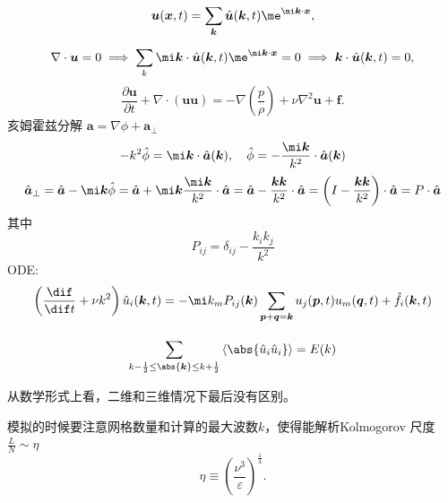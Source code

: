 \documentclass[12pt,a4]{ctexart}
\begin{document}
\begin{equation}
   \bm{u} (\bm{x} , t) = \sum_{\bm{k} }^{} \hat{\bm{u} } (\bm{k} ,t) \me^{\mi \bm{k} \cdot \bm{x} },
\end{equation}
\begin{equation}
   \nabla \cdot \bm{u} = 0 \implies \sum_{k}^{} \mi \bm{k} \cdot \hat{\bm{u} } (\bm{k} ,t) \me^{\mi \bm{k} \cdot \bm{x} } = 0 \implies \bm{k} \cdot \hat{\bm{u} }(\bm{k} ,t)=0,
\end{equation}
\begin{equation}
   \frac{\partial \bm{u} }{\partial t}  + \nabla \cdot (\bm{u} \bm{u} ) = - \nabla \left( \frac{p}{\rho} \right) + \nu \nabla ^2 \bm{u} + \bm{f}.
\end{equation}
亥姆霍兹分解 $\bm{a} = \nabla \phi + \bm{a}_{\bot}$
\begin{equation}
   -k^2 \hat{\phi} = \mi \bm{k}  \cdot \hat{\bm{a} }(\bm{k} ),\quad \hat{\phi} = - \frac{\mi \bm{k} }{k^2} \cdot \hat{\bm{a} }(\bm{k} )
\end{equation}
\begin{equation}
   \hat{\bm{a} }_{\bot} = \hat{\bm{a} } - \mi \bm{k} \hat{\phi} = \hat{\bm{a} } + \mi \bm{k} \frac{\mi \bm{k} }{k^2}\cdot \hat{\bm{a} } = \hat{\bm{a} } - \frac{\bm{k} \bm{k} }{k^2}\cdot \hat{\bm{a} } = \left( I - \frac{\bm{k} \bm{k} }{k^2} \right) \cdot \hat{\bm{a} } = P \cdot \hat{\bm{a} }
\end{equation}
其中
\begin{equation}
   P_{ij} = \delta_{ij} - \frac{k_i k_j}{k^2}
\end{equation}
ODE:
\begin{equation}
   \left( \frac{\dif }{\dif t} + \nu k^2 \right) \hat{u}_i (\bm{k} ,t) = - \mi k_m P_{ij} (\bm{k} )  \sum_{\bm{p} + \bm{q} = \bm{k} }^{} u_j (\bm{p} ,t) u_m(\bm{q} ,t) + \hat{f}_i(\bm{k} ,t)
\end{equation}

\begin{equation}
   \sum_{k-\frac{1}{2}\le \abs{\bm{k} }\le k + \frac{1}{2}}^{} \left< \abs{ \hat{u}_i \hat{u}_i } \right> = E(k)
\end{equation}


从数学形式上看，二维和三维情况下最后没有区别。

模拟的时候要注意网格数量和计算的最大波数$k$，使得能解析Kolmogorov 尺度 $\frac{L}{N} \sim \eta$
\begin{equation}
   \eta \equiv \left( \frac{\nu^{3}}{\varepsilon} \right)^{\frac{1}{4}}.
\end{equation}









\end{document}
